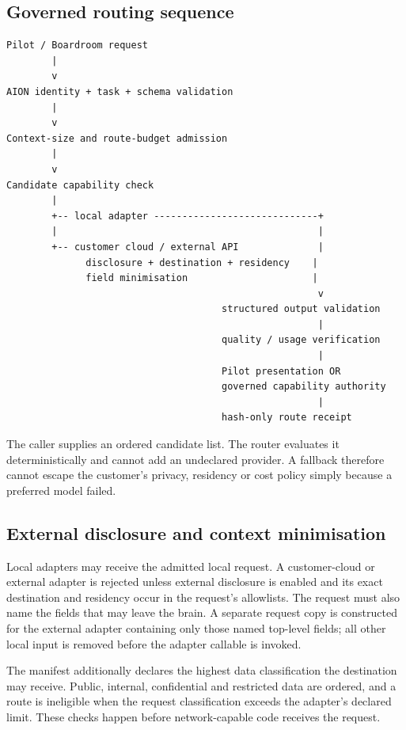 \subsection{Governed routing sequence}

\begin{verbatim}
Pilot / Boardroom request
        |
        v
AION identity + task + schema validation
        |
        v
Context-size and route-budget admission
        |
        v
Candidate capability check
        |
        +-- local adapter -----------------------------+
        |                                              |
        +-- customer cloud / external API              |
              disclosure + destination + residency    |
              field minimisation                      |
                                                       v
                                      structured output validation
                                                       |
                                      quality / usage verification
                                                       |
                                      Pilot presentation OR
                                      governed capability authority
                                                       |
                                      hash-only route receipt
\end{verbatim}

The caller supplies an ordered candidate list.  The router evaluates it
deterministically and cannot add an undeclared provider.  A fallback therefore
cannot escape the customer's privacy, residency or cost policy simply because a
preferred model failed.

\subsection{External disclosure and context minimisation}

Local adapters may receive the admitted local request.  A customer-cloud or external
adapter is rejected unless external disclosure is enabled and its exact destination
and residency occur in the request's allowlists.  The request must also name the
fields that may leave the brain.  A separate request copy is constructed for the
external adapter containing only those named top-level fields; all other local input
is removed before the adapter callable is invoked.

The manifest additionally declares the highest data classification the destination
may receive.  Public, internal, confidential and restricted data are ordered, and a
route is ineligible when the request classification exceeds the adapter's declared
limit.  These checks happen before network-capable code receives the request.


